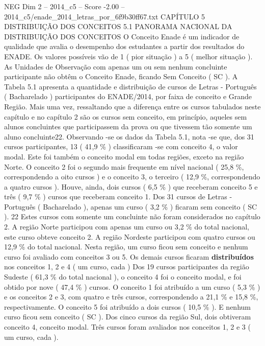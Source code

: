 \begin{textsample}{NEG Dim 2 – 2014\_c5 – Score -2.00 – 2014\_c5/enade\_2014\_letras\_por\_6f9b30ff67.txt}  \label{ex:f2_neg_125}
CAPÍTULO 5 DISTRIBUIÇÃO DOS CONCEITOS 5.1 PANORAMA NACIONAL DA DISTRIBUIÇÃO DOS CONCEITOS O Conceito Enade é um indicador de qualidade que avalia o desempenho dos estudantes a partir dos resultados do ENADE.
Os valores possíveis vão de 1 ( pior situação ) a 5 ( melhor situação ).
As Unidades de Observação com apenas um ou sem nenhum concluinte participante não obtêm o Conceito Enade, ficando Sem Conceito ( SC ).
A Tabela 5.1 apresenta a quantidade e distribuição de cursos de Letras - Português ( Bacharelado ) participantes do ENADE/2014, por faixa de conceito e Grande Região.
Mais uma vez, ressaltando que a diferença entre os cursos tabulados neste capítulo e no capítulo 2 são os cursos sem conceito, em princípio, aqueles sem alunos concluintes que participassem da prova ou que tivessem tão somente um aluno concluinte22.
Observando -se os dados da Tabela 5.1, nota -se que, dos 31 cursos participantes, 13 ( 41,9 \% ) classificaram -se com conceito 4, o valor modal.
Este foi também o conceito modal em todas regiões, exceto na região Norte.
O conceito 2 foi o segundo mais frequente em nível nacional ( 25,8 \%, correspondendo a oito cursos ) e o conceito 3, o terceiro ( 12,9 \%, correspondendo a quatro cursos ).
Houve, ainda, dois cursos ( 6,5 \% ) que receberam conceito 5 e três ( 9,7 \% ) cursos que receberam conceito 1.
Dos 31 cursos de Letras - Português ( Bacharelado ), apenas um curso ( 3,2 \% ) ficaram sem conceito ( SC ). 22 Estes cursos com somente um concluinte não foram considerados no capítulo 2.
A região Norte participou com apenas um curso ou 3,2 \% do total nacional, este curso obteve conceito 2.
A região Nordeste participou com quatro cursos ou 12,9 \% do total nacional.
Nesta região, um curso ficou sem conceito e nenhum curso foi avaliado com conceitos 3 ou 5.
Os demais cursos ficaram \textbf{distribuídos} nos conceitos 1, 2 e 4 ( um curso, cada ) Dos 19 cursos participantes da região Sudeste ( 61,3 \% do total nacional ), o conceito 4 foi o conceito modal, e foi obtido por nove ( 47,4 \% ) cursos.
O conceito 1 foi atribuído a um curso ( 5,3 \% ) e os conceitos 2 e 3, com quatro e três cursos, correspondendo a 21,1 \% e 15,8 \%, respectivamente.
O conceito 5 foi atribuído a dois cursos ( 10,5 \% ).
E nenhum curso ficou sem conceito ( SC ).
Dos cinco cursos da região Sul, dois obtiveram conceito 4, conceito modal.
Três cursos foram avaliados nos conceitos 1, 2 e 3 ( um curso, cada ).

\end{textsample}
